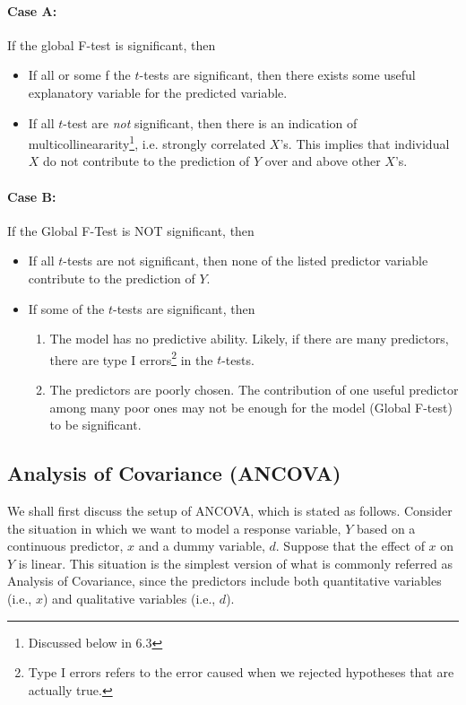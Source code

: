 \documentclass[10pt]{article}
\begin{document}
\paragraph{Case A:} If the global F-test is significant, then
\begin{itemize}
    \item If all or some f the $t$-tests are significant, then there exists some useful explanatory variable for the predicted variable.
    \item If all $t$-test are \textit{not} significant, then there is an indication of multicollineararity\footnote{Discussed below in 6.3}, i.e. strongly correlated $X$'s. This implies that individual $X$ do not contribute to the prediction of $Y$ over and above other $X$'s. 
\end{itemize}
\paragraph{Case B:} If the Global F-Test is NOT significant, then
\begin{itemize}
    \item If all $t$-tests are not significant, then none of the listed predictor variable contribute to the prediction of $Y$.
    \item If some of the $t$-tests are significant, then
        \begin{enumerate}
            \item The model has no predictive ability. Likely, if there are many predictors, there are type I errors\footnote{Type I errors refers to the error caused when we rejected hypotheses that are actually true.} in the $t$-tests. 
            \item The predictors are poorly chosen. The contribution of one useful predictor among many poor ones may not be enough for the model (Global F-test) to be significant. 
        \end{enumerate}
\end{itemize}


\subsection{Analysis of Covariance (ANCOVA)}
We shall first discuss the setup of ANCOVA, which is stated as follows. Consider the situation in which we want to model a response variable, $Y$ based on a continuous predictor, $x$ and a dummy variable, $d$. Suppose that the effect of $x$ on $Y$ is linear. This situation is the simplest version of what is commonly referred as Analysis of Covariance, since the predictors include both quantitative variables (i.e., $x$) and qualitative variables (i.e., $d$). 
\end{document}
